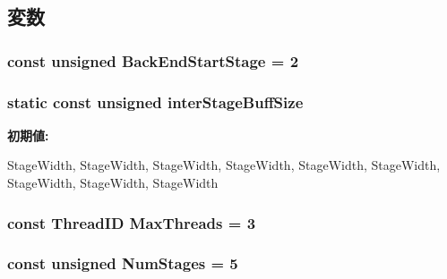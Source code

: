 \subsection{変数}
\hypertarget{namespaceThePipeline_a1508fbbf00b857ada3c63696ded87cf6}{
\subsubsection[{BackEndStartStage}]{\setlength{\rightskip}{0pt plus 5cm}const unsigned {\bf BackEndStartStage} = 2}}
\label{namespaceThePipeline_a1508fbbf00b857ada3c63696ded87cf6}
\hypertarget{namespaceThePipeline_a6e9cdd6ec8350737ec1ab5eb73cbe895}{
\subsubsection[{interStageBuffSize}]{\setlength{\rightskip}{0pt plus 5cm}static const unsigned {\bf interStageBuffSize}}}
\label{namespaceThePipeline_a6e9cdd6ec8350737ec1ab5eb73cbe895}
{\bfseries 初期値:}
\begin{DoxyCode}
 {
        StageWidth, 
        StageWidth, 
        StageWidth, 
        StageWidth, 
        StageWidth, 
        StageWidth, 
        StageWidth, 
        StageWidth, 
        StageWidth  
    }
\end{DoxyCode}
\hypertarget{namespaceThePipeline_ac9c0bbe9cf27d93e08ea8ccc4096e633}{
\subsubsection[{MaxThreads}]{\setlength{\rightskip}{0pt plus 5cm}const {\bf ThreadID} {\bf MaxThreads} = 3}}
\label{namespaceThePipeline_ac9c0bbe9cf27d93e08ea8ccc4096e633}
\hypertarget{namespaceThePipeline_a6918d1731267e5f56969bfb5c240be85}{
\subsubsection[{NumStages}]{\setlength{\rightskip}{0pt plus 5cm}const unsigned {\bf NumStages} = 5}}
